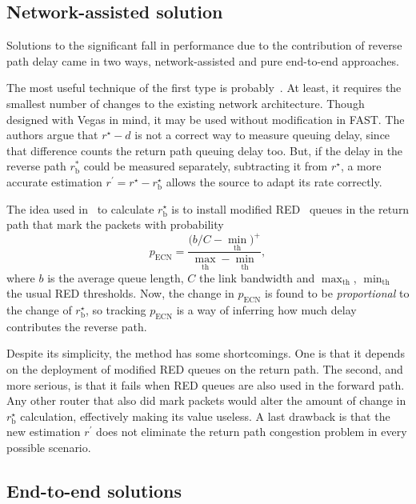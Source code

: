\documentclass[english,times]{ettauth}
\begin{document}
\subsection{Network-assisted solution}
\label{sec:assist-from-netw}

Solutions to the significant fall in performance due to the contribution of
reverse path delay came in two ways, network-assisted and pure end-to-end
approaches.

The most useful technique of the first type is probably~\cite{Liu05}. At
least, it requires the smallest number of changes to the existing network
architecture. Though designed with Vegas in mind, it may be used without
modification in FAST. The authors argue that $r^\star - d$ is not a correct
way to measure queuing delay, since that difference counts the return path
queuing delay too. But, if the delay in the reverse path $r^\ast_\mathrm{b}$
could be measured separately, subtracting it from $r^\star$, a more accurate
estimation $r^\prime = r^\star - r^\star_{\mathrm b}$ allows the source to
adapt its rate correctly.

The idea used in~\cite{Liu05} to calculate $r^\star_{\mathrm b}$ is to install
modified RED~\cite{Floyd93} queues in the return path that mark the packets
with probability
\begin{equation}
  \label{eq:red-reverse}
  p_{\mathrm{ECN}} = \frac{\bigl( b/C - \min_{\mathrm{th}}
    \bigr)^+}{\max_{\mathrm{th}}-\min_{\mathrm{th}}},
\end{equation}
where $b$ is the average queue length, $C$ the link bandwidth and
$\max_{\mathrm{th}}$, $\min_{\mathrm{th}}$ the usual RED thresholds. Now, the
change in $p_\mathrm{ECN}$ is found to be \emph{proportional} to the change of
$r^\star_\mathrm{b}$, so tracking $p_{\mathrm{ECN}}$ is a way of inferring how
much delay contributes the reverse path.

Despite its simplicity, the method has some shortcomings. One is that it
depends on the deployment of modified RED queues on the return path. The
second, and more serious, is that it fails when RED queues are also used in
the forward path. Any other router that also did mark packets would alter the
amount of change in $r^\star_{\mathrm b}$ calculation, effectively making its
value useless. A last drawback is that the new estimation $r^\prime$ does not
eliminate the return path congestion problem in every possible scenario.

\subsection{End-to-end solutions}
\label{sec:end-end-approaches}
\end{document}
